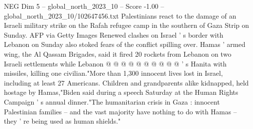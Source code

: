 \begin{textsample}{NEG Dim 5 – global\_north\_2023\_10 – Score -1.00 – global\_north\_2023\_10/102647456.txt}
Palestinians react to the damage of an Israeli military strike on the Rafah refugee camp in the southern of Gaza Strip on Sunday.
AFP via Getty Images Renewed clashes on Israel ' s border with Lebanon on Sunday also stoked fears of the conflict spilling over.
Hamas ' armed wing, the Al Qassam Brigades, said it fired 20 rockets from Lebanon on two Israeli settlements while Lebanon @ @ @ @ @ @ @ @ @ @ ' s Hanita with missiles, killing one civilian."More than 1,300 innocent lives lost in Israel, including at least 27 Americans.
Children and grandparents alike kidnapped, held hostage by Hamas,"Biden said during a speech Saturday at the Human Rights Campaign ' s annual dinner."The humanitarian crisis in Gaza : innocent Palestinian families -- and the vast majority have nothing to do with Hamas -- they ' re being used as human shields."

\end{textsample}
